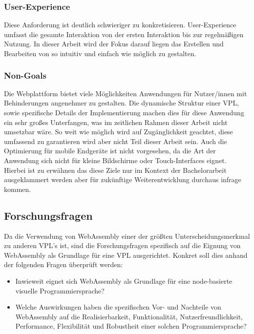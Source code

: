 \documentclass[ngerman]{article}
\begin{document}
\subsubsection{User-Experience}

Diese Anforderung ist deutlich schwieriger zu konkretisieren. User-Experience umfasst die gesamte Interaktion von der ersten Interaktion bis zur regelmäßigen Nutzung. In dieser Arbeit wird der Fokus darauf liegen das Erstellen und Bearbeiten von  so intuitiv und einfach wie möglich zu gestalten.

\subsubsection{Non-Goals}
Die Webplattform bietet viele Möglichkeiten Anwendungen für Nutzer/innen mit Behinderungen angenehmer zu gestalten. 
Die dynamische Struktur einer VPL, sowie spezifische Details der Implementierung machen dies für diese Anwendung ein sehr großes Unterfangen, was im zeitlichen Rahmen dieser Arbeit nicht umsetzbar wäre. So weit wie möglich wird auf Zugänglichkeit geachtet, diese umfassend zu garantieren wird aber nicht Teil dieser Arbeit sein.
\br
Auch die Optimierung für mobile Endgeräte ist nicht vorgesehen, da die Art der Anwendung sich nicht für kleine Bildschirme oder Touch-Interfaces eignet.
\br
Hierbei ist zu erwähnen das diese Ziele nur im Kontext der Bachelorarbeit ausgeklammert werden aber für zukünftige Weiterentwicklung durchaus infrage kommen.

\subsection{Forschungsfragen}
Da die Verwendung von WebAssembly einer der größten Unterscheidungsmerkmal zu anderen VPL's ist, sind die Forschungsfragen spezifisch auf die Eignung von WebAssembly als Grundlage für eine VPL ausgerichtet. Konkret soll dies anhand der folgenden Fragen überprüft werden:
\begin{itemize}
  \item  Inwieweit eignet sich WebAssembly als Grundlage für eine node-basierte visuelle Programmiersprache?  
  \item Welche Auswirkungen haben die spezifischen Vor- und Nachteile von WebAssembly auf die Realisierbarkeit, Funktionalität, Nutzerfreundlichkeit, Performance, Flexibilität und Robustheit einer solchen Programmiersprache?
\end{itemize}
\end{document}
